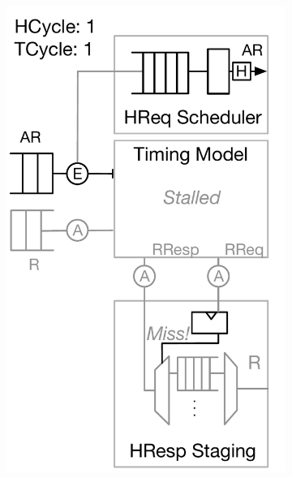 \begin{figure}[t]
\begin{subfigure}[t]{0.24\textwidth}
        \includegraphics[width=\columnwidth]{figures/model-operation-2.pdf}
        \caption{}
        \label{fig:model-operation-2}
    \end{subfigure}
    \begin{subfigure}[t]{0.24\textwidth}

\end{subfigure}
\end{figure}
